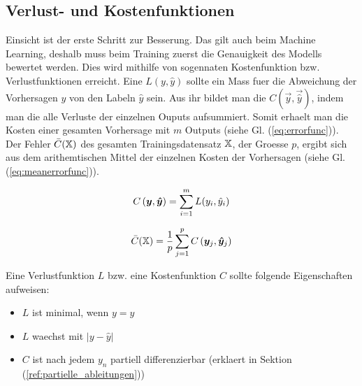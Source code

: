 \subsection{Verlust- und Kostenfunktionen}
Einsicht ist der erste Schritt zur Besserung. Das gilt auch beim Machine Learning, deshalb muss beim Training zuerst die Genauigkeit des Modells bewertet werden.
Dies wird mithilfe von sogennaten Kostenfunktion bzw. Verlustfunktionen
erreicht.
\para{}
Eine  $L(y,\hat{y})$ sollte ein Mass fuer die
Abweichung der Vorhersagen $y$ von den Labeln $\hat{y}$ sein.
Aus ihr bildet man die  $C(\vec{y},\vec{\hat{y}})$, indem man die
alle Verluste der einzelnen Ouputs aufsummiert. Somit erhaelt man die Kosten
einer gesamten Vorhersage mit $m$ Outputs (siehe Gl. (\ref{eq:errorfunc})). \\
Der Fehler $\bar{C}(\mathbb{X})$ des gesamten Trainingsdatensatz $\mathbb{X}$, der
Groesse $p$, ergibt sich aus dem arithemtischen Mittel der einzelnen Kosten der
Vorhersagen (siehe Gl. (\ref{eq:meanerrorfunc})).
\\
\begin{minipage}[h!]{0.5\textwidth}
  \begin{equation}\label{eq:errorfunc}
    C \left(\bm{y},\bm{\hat{y}} \right) = \displaystyle\sum_{i=1}^{m} L(y_i, \hat{y}_i)
  \end{equation}
\end{minipage}
\begin{minipage}[h!]{0.5\textwidth}
  \begin{equation}\label{eq:meanerrorfunc}
    \bar{C}(\mathbb{X}) = \frac{1}{p}\displaystyle\sum_{j=1}^{p} C\left(\bm{y}_j,\bm{\hat{y}}_j\right)
  \end{equation}
\end{minipage}
\para{}
Eine Verlustfunktion $L$ bzw. eine Kostenfunktion $C$ sollte folgende Eigenschaften aufweisen:
\begin{itemize}
\item{$L$ ist minimal, wenn $y = \hat{y}$}
\item{$L$ waechst mit $|y - \hat{y}|$}
\item{$C$ ist nach jedem $y_n$ partiell differenzierbar (erklaert in Sektion (\ref{ref:partielle_ableitungen}))}
\end{itemize}
\para{}

